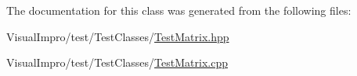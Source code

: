 The documentation for this class was generated from the following files\+:\begin{DoxyCompactItemize}
\item 
Visual\+Impro/test/\+Test\+Classes/\mbox{\hyperlink{_test_matrix_8hpp}{Test\+Matrix.\+hpp}}\item 
Visual\+Impro/test/\+Test\+Classes/\mbox{\hyperlink{_test_matrix_8cpp}{Test\+Matrix.\+cpp}}\end{DoxyCompactItemize}
